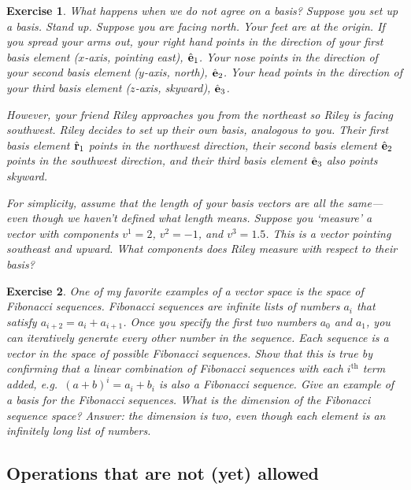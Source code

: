 \documentclass[12pt]{article}
\newtheorem{exercise}{Exercise}[section]
\begin{document}
\begin{exercise}
What happens when we do not agree on a basis? Suppose you set up a basis. Stand up. Suppose you are facing north. Your feet are at the origin. If you spread your arms out, your right hand points in the direction of your first basis element ($x$-axis, pointing east), ${\hat{\mathbf{e}}}_1$. Your nose points in the direction of your second basis element ($y$-axis, north), ${\hat{\mathbf{e}}}_2$. Your head points in the direction of your third basis element ($z$-axis, skyward), ${\hat{\mathbf{e}}}_3$.

However, your friend Riley approaches you from the northeast so Riley is facing southwest. Riley decides to set up their own basis, analogous to you. Their first basis element ${\hat{\mathbf{r}}}_1$ points in the northwest direction, their second basis element ${\hat{\mathbf{e}}}_2$ points in the southwest direction, and their third basis element ${\hat{\mathbf{e}}}_3$ also points skyward. 

For simplicity, assume that the length of your basis vectors are all the same---even though we haven't defined what length means. Suppose you `measure' a vector with components $v^1 = 2$, $v^2=-1$, and $v^3=1.5$. This is a vector pointing southeast and upward. What components does Riley measure with respect to their basis?
\end{exercise}

\begin{exercise}
One of my favorite examples of a vector space is the space of Fibonacci sequences. Fibonacci sequences are infinite lists of numbers $a_i$ that satisfy $a_{i+2} = a_i+a_{i+1}$. Once you specify the first two numbers $a_0$ and $a_1$, you can iteratively generate every other number in the sequence. Each sequence is a vector in the space of possible Fibonacci sequences. Show that this is true by confirming that a linear combination of Fibonacci sequences with each $i^\text{th}$ term added, e.g.\ $(a+b)^i = a_i+b_i$ is also a Fibonacci sequence. Give an example of a basis for the Fibonacci sequences. What is the dimension of the Fibonacci sequence space? \emph{Answer}: the dimension is two, even though each element is an infinitely long list of numbers.
\end{exercise}


\subsection{Operations that are not (yet) allowed}
\end{document}
